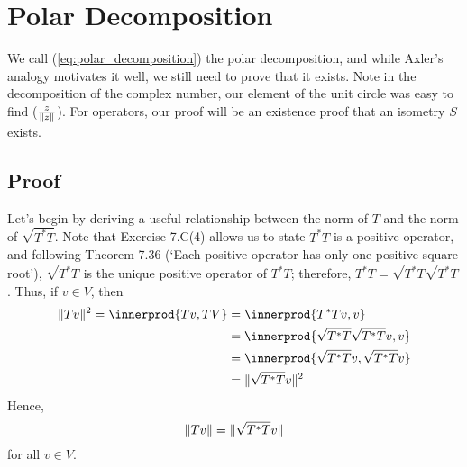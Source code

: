 \documentclass{article}
\DeclarePairedDelimiter{\innerprod}\langle\rangle
\begin{document}
\section{Polar Decomposition}
We call (\ref{eq:polar_decomposition}) the polar decomposition, and while Axler's analogy motivates it well, we still need to prove that it exists. Note in the decomposition of the complex number, our element of the unit circle was easy to find ($\frac{z}{\lVert z\rVert}$). For operators, our proof will be an existence proof that an isometry $S$ exists.

\subsection{Proof}
Let's begin by deriving a useful relationship between the norm of $T$ and the norm of $\sqrt{T^*T}$. Note that Exercise 7.C(4) allows us to state $T^*T$ is a positive operator, and following Theorem 7.36 (`Each positive operator has only one positive square root'), $\sqrt{T^*T}$ is the unique positive operator of $T^*T$; therefore, $T^*T=\sqrt{T^*T}\sqrt{T^*T}$. Thus, if $v\in V$, then
\begin{align*}
    \norm{Tv}^2=\innerprod{Tv,TV}&=\innerprod{T^*Tv,v} \\
    &= \innerprod{\sqrt{T^*T}\sqrt{T^*T}v,v} \\
    &= \innerprod{\sqrt{T^*T}v,\sqrt{T^*T}v} \\
    &= \norm{\sqrt{T^*T}v}^2
\end{align*}
Hence,
\begin{equation}\label{eq:norm_relationship}
    \lVert Tv\rVert=\lVert\sqrt{T^*T}v\rVert
\end{equation}
for all $v\in V$.
\end{document}

